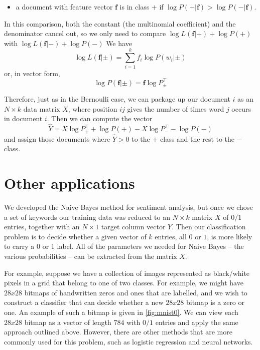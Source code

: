 \documentclass[
  oneside]{scrbook}
\providecommand{\tightlist}{%
  \setlength{\itemsep}{0pt}\setlength{\parskip}{0pt}}
\begin{document}
\begin{itemize}
\tightlist
\item
  a document with feature vector \(\mathbf{f}\) is in class \(+\) if
  \(\log P(+|\mathbf{f})>\log P(-|\mathbf{f})\).
\end{itemize}

In this comparison, both the constant (the multinomial coefficient) and
the denominator cancel out, so we only need to compare
\(\log L(\mathbf{f}|+)+\log P(+)\) with
\(\log L(\mathbf{f}|-)+\log P(-)\) We have \[
\log L(\mathbf{f}|\pm) = \sum_{i=1}^{k} f_{i}\log P(w_{i}|\pm)
\] or, in vector form, \[
\log P(\mathbf{f}|\pm) = \mathbf{f}\log P_{\pm}^{\intercal}
\]

Therefore, just as in the Bernoulli case, we can package up our document
\(i\) as an \(N\times k\) data matrix \(X\), where position \(ij\) gives
the number of times word \(j\) occurs in document \(i\). Then we can
compute the vector \[
\hat{Y} = X\log P_{+}^{\intercal} + \log P(+)-X\log P_{-}^{\intercal} - \log P(-)
\] and assign those documents where \(\hat{Y}>0\) to the \(+\) class and
the rest to the \(-\) class.

\hypertarget{other-applications}{%
\section{Other applications}\label{other-applications}}

We developed the Naive Bayes method for sentiment analysis, but once we
chose a set of keywords our training data was reduced to an
\(N\times k\) matrix \(X\) of \(0/1\) entries, together with an
\(N\times 1\) target column vector \(Y\). Then our classification
problem is to decide whether a given vector of \(k\) entries, all \(0\)
or \(1\), is more likely to carry a \(0\) or \(1\) label. All of the
parameters we needed for Naive Bayes -- the various probabilities -- can
be extracted from the matrix \(X\).

For example, suppose we have a collection of images represented as
black/white pixels in a grid that belong to one of two classes. For
example, we might have \(28x28\) bitmaps of handwritten zeros and ones
that are labelled, and we wish to construct a classifier that can decide
whether a new \(28x28\) bitmap is a zero or one. An example of such a
bitmap is given in \cref{fig:mnist0}. We can view each \(28x28\) bitmap
as a vector of length \(784\) with \(0/1\) entries and apply the same
approach outlined above. However, there are other methods that are more
commonly used for this problem, such as logistic regression and neural
networks.
\end{document}
